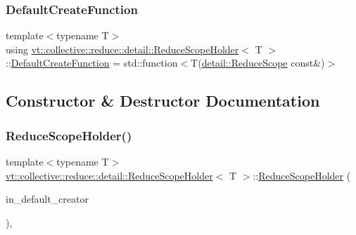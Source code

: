 \subsubsection{\texorpdfstring{Default\+Create\+Function}{DefaultCreateFunction}}
{\footnotesize\ttfamily template$<$typename T$>$ \\
using \hyperlink{structvt_1_1collective_1_1reduce_1_1detail_1_1_reduce_scope_holder}{vt\+::collective\+::reduce\+::detail\+::\+Reduce\+Scope\+Holder}$<$ T $>$\+::\hyperlink{structvt_1_1collective_1_1reduce_1_1detail_1_1_reduce_scope_holder_ac1bca1874a023b11bdc3c26b165c3b20}{Default\+Create\+Function} =  std\+::function$<$T(\hyperlink{structvt_1_1collective_1_1reduce_1_1detail_1_1_reduce_scope}{detail\+::\+Reduce\+Scope} const\&)$>$}



\subsection{Constructor \& Destructor Documentation}
\mbox{\label{structvt_1_1collective_1_1reduce_1_1detail_1_1_reduce_scope_holder_a08ab58084a54f2cfaa04602120e93b76}} 
\subsubsection{\texorpdfstring{Reduce\+Scope\+Holder()}{ReduceScopeHolder()}}
{\footnotesize\ttfamily template$<$typename T$>$ \\
\hyperlink{structvt_1_1collective_1_1reduce_1_1detail_1_1_reduce_scope_holder}{vt\+::collective\+::reduce\+::detail\+::\+Reduce\+Scope\+Holder}$<$ T $>$\+::\hyperlink{structvt_1_1collective_1_1reduce_1_1detail_1_1_reduce_scope_holder}{Reduce\+Scope\+Holder} (\begin{DoxyParamCaption}\item[{\hyperlink{structvt_1_1collective_1_1reduce_1_1detail_1_1_reduce_scope_holder_ac1bca1874a023b11bdc3c26b165c3b20}{Default\+Create\+Function}}]{in\+\_\+default\+\_\+creator }\end{DoxyParamCaption})\hspace{0.3cm}{\ttfamily [inline]}, {\ttfamily [explicit]}}



